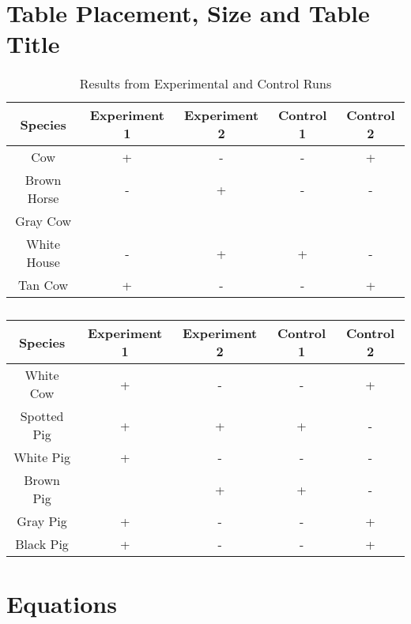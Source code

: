 \section{Table Placement, Size and Table Title}


\begin{table}[!htbp]
\captionsetup{justification=centering}

\caption{Results from Experimental and Control Runs \label{table:control_runs}}

\begin{tabular}{|c|c|c|c|c|}
\hline
Species & Experiment 1 & Experiment 2 & Control 1 & Control 2\\
\hline
Cow & + & - & - & +\\
\hline
Brown Horse & - & + & - & -\\
\hline
Gray Cow &  &  &  & \\
\hline
White House & - & + & + & -\\
\hline
Tan Cow & + & - & - & +\\
\hline

\end{tabular}
\end{table}

 \cleardoublepage

 \begin{table}[!htbp]
 \ContinuedFloat
\captionsetup{list=off, format=cont}

 \label{table:control_runs_continued}
 
 \caption{} 

\begin{tabular}{|c|c|c|c|c|}
\hline
Species & Experiment 1 & Experiment 2 & Control 1 & Control 2\\
\hline
White Cow & + & - & - & +\\
\hline
Spotted Pig & + & + & + & -\\
\hline
White Pig & + & - & - & - \\
\hline
Brown Pig &  & + & + & -\\
\hline
Gray Pig & + & - & - & +\\
\hline
Black Pig & + & - & - & +\\
\hline

\end{tabular}
\end{table}



\section{Equations}

